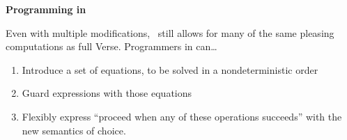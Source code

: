 \documentclass[article,screen,12pt, nonacm]{acmart}
\begin{document}

    \bf{Programming in \VMinus}
        
    Even with multiple modifications, \VMinus\ still allows for many of the same
    pleasing computations as full Verse. Programmers in \VMinus can\dots
        \begin{enumerate}
            \item Introduce a set of equations, to be solved in a
            nondeterministic order 
            \item Guard expressions with those equations 
            \item Flexibly express “proceed when any of these operations
            succeeds” with the new semantics of choice.  
        \end{enumerate}
\end{document}
